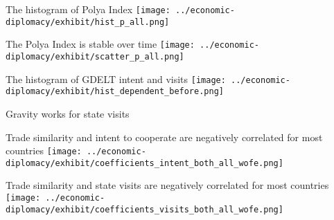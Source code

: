 \documentclass[
  ignorenonframetext,
  aspectratio=16,
]{beamer}
\begin{document}
\begin{frame}{The histogram of Polya Index}
\protect\hypertarget{the-histogram-of-polya-index}{}
\texttt{[image: ../economic-diplomacy/exhibit/hist\_p\_all.png]}
\end{frame}

\begin{frame}{The Polya Index is stable over time}
\protect\hypertarget{the-polya-index-is-stable-over-time}{}
\texttt{[image: ../economic-diplomacy/exhibit/scatter\_p\_all.png]}
\end{frame}

\begin{frame}{The histogram of GDELT intent and visits}
\protect\hypertarget{the-histogram-of-gdelt-intent-and-visits}{}
\texttt{[image: ../economic-diplomacy/exhibit/hist\_dependent\_before.png]}
\end{frame}

\begin{frame}{Gravity works for state visits}
\protect\hypertarget{gravity-works-for-state-visits}{}

\end{frame}

\begin{frame}{Trade similarity and intent to cooperate are negatively
correlated for most countries}
\protect\hypertarget{trade-similarity-and-intent-to-cooperate-are-negatively-correlated-for-most-countries}{}
\texttt{[image: ../economic-diplomacy/exhibit/coefficients\_intent\_both\_all\_wofe.png]}
\end{frame}

\begin{frame}{Trade similarity and state visits are negatively
correlated for most countries}
\protect\hypertarget{trade-similarity-and-state-visits-are-negatively-correlated-for-most-countries}{}
\texttt{[image: ../economic-diplomacy/exhibit/coefficients\_visits\_both\_all\_wofe.png]}
\end{frame}
\end{document}
